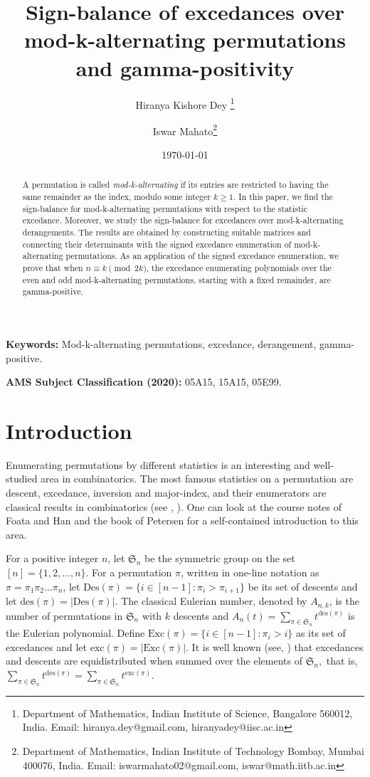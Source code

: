 \documentclass[12pt]{article}
\title{Sign-balance of excedances over mod-k-alternating permutations and gamma-positivity}
\author{Hiranya Kishore Dey \thanks{Department of Mathematics, Indian Institute of Science, Bangalore 560012, India. Email: hiranya.dey@gmail.com, hiranyadey@iisc.ac.in} \and Iswar Mahato\thanks{Department of Mathematics, Indian Institute of Technology Bombay, Mumbai 400076, India. Email: iswarmahato02@gmail.com, iswar@math.iitb.ac.in}}
\date{\today}
\newcommand{\SSS}{\mathfrak{S}}
\newcommand{\des}{\mathrm{des}}
\newcommand{\exc}{\mathrm{exc}}
\newcommand{\Exc}{\mathrm{Exc}}
\begin{document}
\maketitle

\begin{abstract}
A permutation is called {\it mod-k-alternating} if its entries are restricted to having the same remainder as the index, modulo some integer $k \geq 1.$ In this paper, we find the sign-balance for 
mod-k-alternating permutations with respect to the statistic excedance. Moreover, we study the sign-balance for excedances over mod-k-alternating derangements. The results are obtained by constructing suitable matrices and connecting their determinants with the signed excedance enumeration of mod-k-alternating permutations. As an application of the signed excedance enumeration, we prove that when $n \equiv k \pmod {2k}$, the excedance enumerating polynomials over the even and odd mod-k-alternating permutations, starting with a fixed remainder, are gamma-positive. 
\end{abstract}

\textbf{Keywords:} Mod-k-alternating permutations, excedance, derangement, gamma-positive.

\medskip 

{\bf AMS Subject Classification (2020):} 05A15, 15A15, 05E99.

\section{Introduction}\label{sec:intro}

Enumerating permutations by different statistics is an interesting and well-studied area in combinatorics. The most famous statistics on a permutation are descent, excedance, inversion and major-index, and their enumerators are classical results in combinatorics (see \cite{Foata_netto}, \cite{Macmahon-indicesofperm}). One can look at the course notes of Foata and Han \cite{Foata-Han-qseries} and the book of Petersen \cite{Petersen-book} for a self-contained introduction to this area. 

For a positive integer $n$, let $\mathfrak{S}_n$ be the symmetric group on the set $[n]=\{1,2,\hdots,n\}$. 
For a permutation $\pi$, written in one-line notation as $\pi=\pi_1 \pi_2 \dots \pi_n$, let $\mathrm{Des}(\pi)= \{ i \in [n-1]: \pi_i> \pi_{i+1} \}$ be its set of descents and let $\mathrm{des}(\pi)= |\mathrm{Des}(\pi)|.$ The classical Eulerian number, denoted by $A_{n,k}$, is the number of permutations in $\SSS_n$
with $k$ descents and $A_n(t)= \sum _{\pi \in \SSS_n} t^{\des(\pi)} $ is the Eulerian polynomial. Define   $\Exc(\pi)= \{ i \in [n-1]: \pi_i > i \}$ as its set of excedances and let $\mathrm{exc}(\pi)= |\mathrm{Exc}(\pi)|.$ It is well known (see, \cite{Macmahon-indicesofperm}) that excedances and descents are equidistributed when summed over the elements of $\SSS_n,$ that is,
$\sum_{\pi \in \SSS_n}t^{\des(\pi)}= \sum_{\pi \in \SSS_n} t^{\exc(\pi)}.$ 
\end{document}
